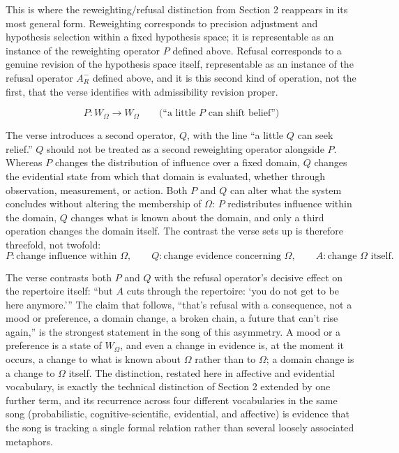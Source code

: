 \documentclass[11pt]{article}
\begin{document}
This is where the reweighting/refusal distinction from Section 2 reappears in its most general form. Reweighting corresponds to precision adjustment and hypothesis selection within a fixed hypothesis space; it is representable as an instance of the reweighting operator $P$ defined above. Refusal corresponds to a genuine revision of the hypothesis space itself, representable as an instance of the refusal operator $A^{-}_R$ defined above, and it is this second kind of operation, not the first, that the verse identifies with admissibility revision proper.

\[
P : W_\Omega \rightarrow W_\Omega \qquad\text{(``a little $P$ can shift belief'')}
\]

The verse introduces a second operator, $Q$, with the line ``a little $Q$ can seek relief.'' $Q$ should not be treated as a second reweighting operator alongside $P$. Whereas $P$ changes the distribution of influence over a fixed domain, $Q$ changes the evidential state from which that domain is evaluated, whether through observation, measurement, or action. Both $P$ and $Q$ can alter what the system concludes without altering the membership of $\Omega$: $P$ redistributes influence within the domain, $Q$ changes what is known about the domain, and only a third operation changes the domain itself. The contrast the verse sets up is therefore threefold, not twofold:
\[
P : \text{change influence within } \Omega, \qquad
Q : \text{change evidence concerning } \Omega, \qquad
A : \text{change } \Omega \text{ itself.}
\]

The verse contrasts both $P$ and $Q$ with the refusal operator's decisive effect on the repertoire itself: ``but $A$ cuts through the repertoire: `you do not get to be here anymore.''' The claim that follows, ``that's refusal with a consequence, not a mood or preference, a domain change, a broken chain, a future that can't rise again,'' is the strongest statement in the song of this asymmetry. A mood or a preference is a state of $W_\Omega$, and even a change in evidence is, at the moment it occurs, a change to what is known about $\Omega$ rather than to $\Omega$; a domain change is a change to $\Omega$ itself. The distinction, restated here in affective and evidential vocabulary, is exactly the technical distinction of Section 2 extended by one further term, and its recurrence across four different vocabularies in the same song (probabilistic, cognitive-scientific, evidential, and affective) is evidence that the song is tracking a single formal relation rather than several loosely associated metaphors.
\end{document}
